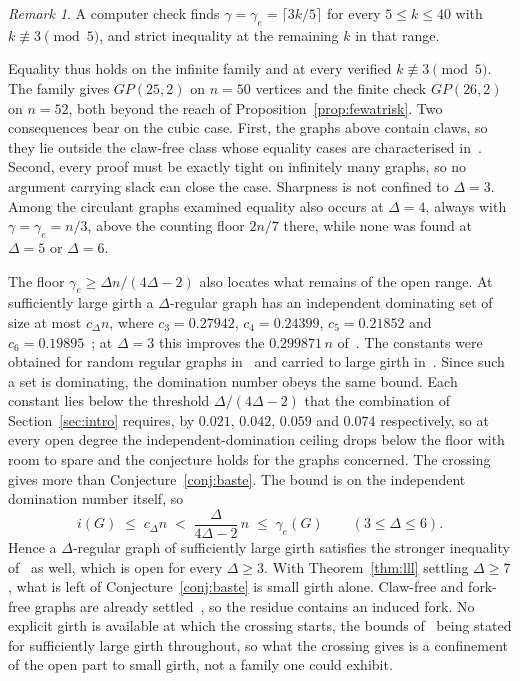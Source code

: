 \documentclass[11pt]{article}
\theoremstyle{definition}
\theoremstyle{remark}
\newtheorem{remark}{Remark}
\newcommand{\edom}{\gamma_{e}}
\newcommand{\ind}{i}
\begin{document}
\begin{remark}
A computer check finds $\gamma = \edom = \lceil 3k/5 \rceil$ for every $5 \le k \le 40$
with $k \not\equiv 3 \pmod 5$, and strict inequality at the remaining $k$ in that range.
\end{remark}

\noindent
Equality thus holds on the infinite family and at every verified $k \not\equiv 3
\pmod 5$. The family gives $GP(25,2)$ on $n = 50$ vertices and the finite check
$GP(26,2)$ on $n = 52$, both beyond the reach of Proposition~\ref{prop:fewatrisk}. Two
consequences bear on the cubic case. First, the graphs above contain claws, so
they lie outside the claw-free class whose equality cases are characterised
in~\cite{PanPanTie2025}. Second, every proof must be exactly tight on infinitely
many graphs, so no argument carrying slack can close the case. Sharpness is not
confined to $\Delta = 3$. Among the circulant graphs examined equality also
occurs at $\Delta = 4$, always with $\gamma = \edom = n/3$, above the counting
floor $2n/7$ there, while none was found at $\Delta = 5$ or $\Delta = 6$.

\medskip\noindent
The floor $\edom \ge \Delta n/(4\Delta-2)$ also locates what remains of the open
range. At sufficiently large girth a $\Delta$-regular graph has an independent
dominating set of size at most $c_\Delta n$, where $c_3 = 0.27942$, $c_4 =
0.24399$, $c_5 = 0.21852$ and $c_6 = 0.19895$~\cite{HoppenWormald2018}; at
$\Delta = 3$ this improves the $0.299871\,n$ of~\cite{KralSkodaVolec2012}. The
constants were obtained for random regular graphs
in~\cite{DuckworthWormald2002,DuckworthWormald2006} and carried to large
girth in~\cite{HoppenWormald2018}. Since such a set is dominating, the domination
number obeys the same bound.
Each constant lies below the threshold $\Delta/(4\Delta-2)$ that the combination
of Section~\ref{sec:intro} requires, by $0.021$, $0.042$, $0.059$ and $0.074$
respectively, so at every open degree the independent-domination ceiling drops
below the floor with room to spare and the conjecture holds for the graphs
concerned. The crossing gives more than
Conjecture~\ref{conj:baste}. The bound is on the independent domination number
itself, so
\[
  \ind(G) \;\le\; c_\Delta n \;<\; \frac{\Delta}{4\Delta-2}\,n \;\le\; \edom(G)
  \qquad (3 \le \Delta \le 6).
\]
Hence a $\Delta$-regular graph of sufficiently large girth satisfies the stronger
inequality of~\cite{Davila2025reverie} as well, which is open for every $\Delta \ge
3$. With Theorem~\ref{thm:lll} settling $\Delta \ge 7$, what is left of
Conjecture~\ref{conj:baste} is small girth alone. Claw-free and fork-free graphs
are already settled~\cite{Civan2023,ManiyaPradhan2024}, so the residue contains an
induced fork. No explicit girth is available at which
the crossing starts, the bounds of~\cite{HoppenWormald2018} being stated for
sufficiently large girth throughout,
so what the crossing gives is a confinement
of the open part to small girth, not a family one could
exhibit.
\end{document}
